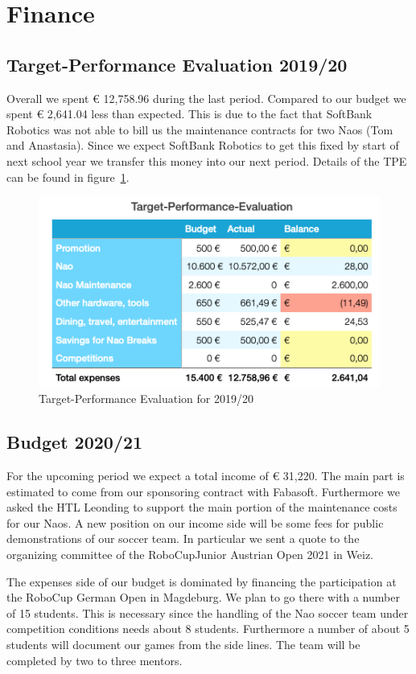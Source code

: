 \documentclass[11pt]{article}
\begin{document}
\section{Finance}
\subsection{Target-Performance Evaluation 2019/20}\label{sec:tpe}
Overall we spent € 12,758.96 during the last period. Compared to our budget we spent € 2,641.04 less than expected. This is due to the fact that SoftBank Robotics was not able to bill us the maintenance contracts for two Naos (Tom and Anastasia). Since we expect SoftBank Robotics to get this fixed by start of next school year we transfer this money into our next period. Details of the TPE can be found in figure~\ref{fig:tpe}.
\begin{figure}
\begin{center}
\includegraphics[scale=0.5]{img/targetPerformanceEvaluation.png}
\end{center}
\caption{Target-Performance Evaluation for 2019/20}
\label{fig:tpe}
\end{figure}

\subsection{Budget 2020/21}\label{sec:budget}
For the upcoming period we expect a total income of € 31,220. The main part is estimated to come from our sponsoring contract with Fabasoft. Furthermore we asked the HTL Leonding to support the main portion of the maintenance costs for our Naos. A new position on our income side will be some fees for public demonstrations of our soccer team. In particular we sent a quote to the organizing committee of the RoboCupJunior Austrian Open 2021 in Weiz.

The expenses side of our budget is dominated by financing the participation at the RoboCup German Open in Magdeburg. We plan to go there with a number of 15 students. This is necessary since the handling of the Nao soccer team under competition conditions needs about 8 students. Furthermore a number of about 5 students will document our games from the side lines. The team will be completed by two to three mentors.
\end{document}
